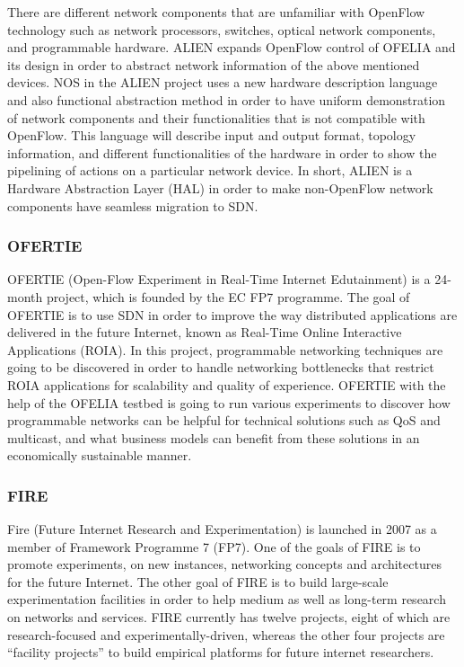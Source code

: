 There are different network components that are unfamiliar with OpenFlow technology such as network processors, switches, optical network components, and programmable hardware. ALIEN expands OpenFlow control of OFELIA and its design in order to abstract network information of the above mentioned devices. NOS in the ALIEN project uses a new hardware description language and also functional abstraction method in order to have uniform demonstration of network components and their functionalities that is not compatible with OpenFlow. This language will describe input and output format, topology information, and different functionalities of the hardware in order to show the pipelining of actions on a particular network device. In short, ALIEN is a Hardware Abstraction Layer (HAL) in order to make non-OpenFlow network components have seamless migration to SDN.    

\subsubsection{OFERTIE}

OFERTIE (Open-Flow Experiment in Real-Time Internet Edutainment) is a 24-month project, which is founded by the EC FP7 programme. The goal of OFERTIE is to use SDN in order to improve the way distributed applications are delivered in the future Internet, known as Real-Time Online Interactive Applications (ROIA). In this project, programmable networking techniques are going to be discovered in order to handle networking bottlenecks that restrict ROIA applications for scalability and quality of experience. OFERTIE with the help of the OFELIA testbed is going to run various experiments to discover how programmable networks can be helpful for technical solutions such as QoS and multicast, and what business models can benefit from these solutions in an economically sustainable manner. \cite{OFERTIEproject} 

\subsubsection{FIRE}

Fire (Future Internet Research and Experimentation) is launched in 2007 as a member of Framework Programme 7 (FP7). One of the goals of FIRE is to promote experiments, on new instances, networking concepts and architectures for the future Internet. The other goal of FIRE is to build large-scale experimentation facilities in order to help medium as well as long-term research on networks and services. FIRE currently has twelve projects, eight of which are research-focused and experimentally-driven, whereas the other four projects are “facility projects” to build empirical platforms for future internet researchers. \cite{FIREproject}  

\clearpage
